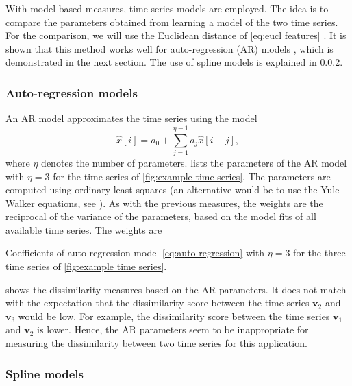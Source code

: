 \documentclass[10pt,final,a4paper,oneside,onecolumn]{article}
\newcommand{\profile}[1]{\textbf{v}_{#1}}
\theoremstyle{plain}\newtheorem{definition}{Definition}[section]    %
\theoremstyle{definition}\newtheorem{example}{Example}[section]     %
\theoremstyle{remark}\newtheorem{remarkenv}{Remark}[section]        %
\begin{document}
With model-based measures, time series models are employed. The idea is to compare the parameters obtained from learning a model of the two time series. For the comparison, we will use the Euclidean distance of \cref{eq:eucl features} \cite{serra2014empirical}. It is shown that this method works well for auto-regression (AR) models \cite{piccolo1990distance, corduas2008autoregressive}, which is demonstrated in the next section. The use of spline models is explained in \cref{sec:spline models}.


\subsubsection{Auto-regression models}
\label{sec:auto regression models}
An AR model approximates the time series using the model 
\begin{equation}
	\label{eq:auto-regression}
	\hat{x}[i] = a_0 + \sum_{j=1}^{\eta-1} a_j \hat{x}[i-j],
\end{equation}
where $\eta$ denotes the number of parameters.  lists the parameters of the AR model with $\eta=3$ for the time series of \cref{fig:example time series}. The parameters are computed using ordinary least squares (an alternative would be to use the Yule-Walker equations, see \cite{gardner1988spectral}). As with the previous measures, the weights are the reciprocal of the variance of the parameters, based on the model fits of all available time series. The weights are 

\begin{table}
	\centering
	\caption{Coefficients of auto-regression model \cref{eq:auto-regression} with $\eta=3$ for the three time series of \cref{fig:example time series}.}
	\label{tab:ar coefficients}
	
\end{table}

 shows the dissimilarity measures based on the AR parameters. It does not match with the expectation that the dissimilarity score between the time series $\profile{2}$ and $\profile{3}$ would be low. For example, the dissimilarity score between the time series $\profile{1}$ and $\profile{2}$ is lower. Hence, the AR parameters seem to be inappropriate for measuring the dissimilarity between two time series for this application.


\subsubsection{Spline models}
\label{sec:spline models}
\end{document}
